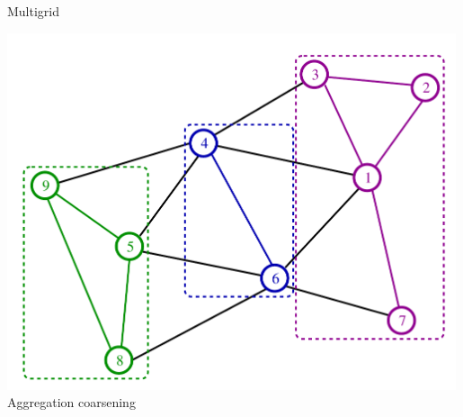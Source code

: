 \begin{frame}{Multigrid}
\begin{minipage}{0.48\textwidth}
\begin{center}
    \includegraphics[width=0.99\textwidth]{figures/graph-ag.pdf} \\
    Aggregation coarsening
  \end{center}
 \end{minipage}
 \vspace*{.5cm}
\end{frame}





